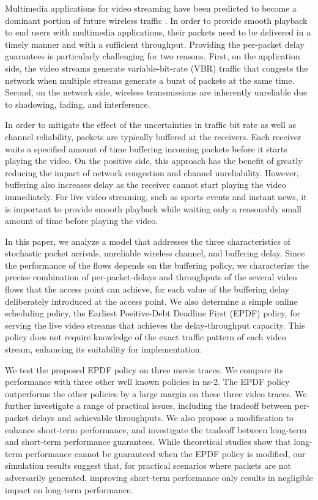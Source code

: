 \documentclass[10pt,nocopyrightspace]{sigplan-proc-varsize-1in}
\begin{document}
Multimedia applications for video streaming have been predicted to become a dominant portion of future wireless traffic \cite{cisco}. In order to provide smooth playback to end users with multimedia applications, their packets need to be delivered in a timely manner and with a sufficient throughput. Providing the per-packet delay guarantees is particularly challenging for two reasons. First, on the application side, the video streams generate variable-bit-rate (VBR) traffic that congests the network when multiple streams generate a burst of packets at the same time. Second, on the network side, wireless transmissions are inherently unreliable due to shadowing, fading, and interference.

In order to mitigate the effect of the uncertainties in traffic bit rate as well as channel reliability, packets are typically buffered at the receivers. Each receiver waits a specified amount of time buffering incoming packets before it starts playing the video. On the positive side, this approach has the benefit of greatly reducing the impact of network congestion and channel unreliability. However, buffering also increases delay as the receiver cannot start playing the video immediately. For live video streaming, such as sports events and instant news, it is important to provide smooth playback while waiting only a reasonably small amount of time before playing the video.

In this paper, we analyze a model that addresses the three characteristics of stochastic packet arrivals, unreliable wireless channel, and buffering delay. Since the performance of the flows depends on the buffering policy, we characterize the precise combination of per-packet-delays and throughputs of the several video flows that the access point can achieve, for each value of the buffering delay deliberately introduced at the access point. We also determine a simple online scheduling policy, the Earliest Positive-Debt Deadline First (EPDF) policy, for serving the live video streams that achieves the delay-throughput capacity. This policy does not require knowledge of the exact traffic pattern of each video stream, enhancing its suitability for implementation.

We test the proposed EPDF policy on three movie traces. We compare its performance with three other well known policies in ns-2. The EPDF policy outperforms the other policies by a large margin on these three video traces. We further investigate a range of practical issues, including the tradeoff between per-packet delays and achievable throughputs. We also propose a modification to enhance short-term performance, and investigate the tradeoff between long-term and short-term performance guarantees. While theoretical studies show that long-term performance cannot be guaranteed when the EPDF policy is modified, our simulation results suggest that, for practical scenarios where packets are not adversarily generated, improving short-term performance only results in negligible impact on long-term performance.
\end{document}
